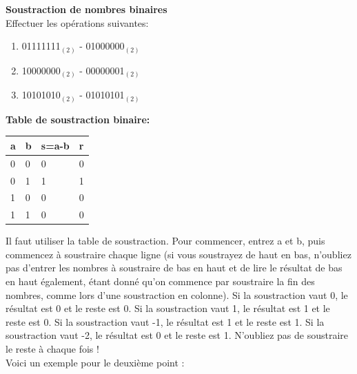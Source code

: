 \begin{Exercice}[15 minutes] \textbf{Soustraction de nombres binaires}\\
    Effectuer les opérations suivantes:

    \begin{enumerate}
        \item 01111111$_{(2)}$ - 01000000$_{(2)}$
        \item 10000000$_{(2)}$ - 00000001$_{(2)}$
        \item 10101010$_{(2)}$ - 01010101$_{(2)}$
    \end{enumerate}

    \begin{conseil}
        \textbf{Table de soustraction binaire:}\\
        \begin{tabular}{| C{0.1\textwidth} | C{0.1\textwidth} | C{0.1\textwidth} | C{0.1\textwidth} |} 
            \hline
            \textbf{a} & \textbf{b} & \textbf{s=a-b} & \textbf{r}\\ [0.5ex]
             & 0 & 0 & 0 \\ [0.5ex] 
             & 1 & 1 & 1 \\ [0.5ex] 
             & 0 & 0 & 0 \\ [0.5ex] 
             & 1 & 0 & 0 \\ [0.5ex] 
            \hline
        \end{tabular}
    \end{conseil}
    
    \begin{solution}
        Il faut utiliser la table de soustraction. Pour commencer, entrez a et b, puis commencez à soustraire chaque ligne (si vous soustrayez de haut en bas, n'oubliez pas d'entrer les nombres à soustraire de bas en haut et de lire le résultat de bas en haut également, étant donné qu'on commence par soustraire la fin des nombres, comme lors d'une soustraction en colonne). Si la soustraction vaut 0, le résultat est 0 et le reste est 0. Si la soustraction vaut 1, le résultat est 1 et le reste est 0. Si la soustraction vaut -1, le résultat est 1 et le reste est 1. Si la soustraction vaut -2, le résultat est 0 et le reste est 1. N'oubliez pas de soustraire le reste à chaque fois ! \\

Voici un exemple pour le deuxième point : \\
 

\end{solution}
\end{Exercice}
